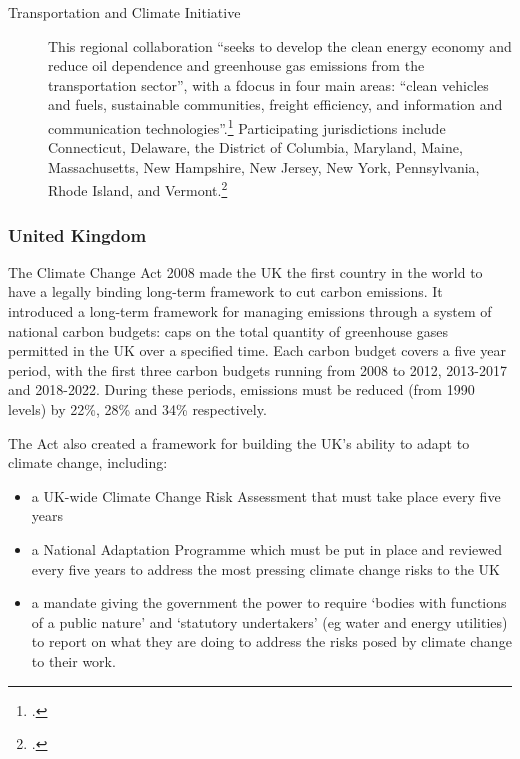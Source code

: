\begin{description}
	\item[Transportation and Climate Initiative] This regional collaboration ``seeks to develop the clean energy economy and reduce oil dependence and greenhouse gas emissions from the transportation sector'', with a fdocus in four main areas: ``clean vehicles and fuels, sustainable communities, freight efficiency, and information and communication technologies''.\footcite[][]{TranspoClimate} Participating jurisdictions include Connecticut, Delaware, the District of Columbia, Maryland, Maine, Massachusetts, New Hampshire, New Jersey, New York, Pennsylvania, Rhode Island, and Vermont.\footcite[][]{GeorgetownOnTC}
\end{description}


	\subsubsection{United Kingdom}

The Climate Change Act 2008 made the UK the first country in the world to have a legally binding long-term framework to cut carbon emissions.  It introduced a long-term framework for managing emissions through a system of national carbon budgets: caps on the total quantity of greenhouse gases permitted in the UK over a specified time. Each carbon budget covers a five year period, with the first three carbon budgets running from 2008 to 2012, 2013-2017 and 2018-2022. During these periods, emissions must be reduced (from 1990 levels) by 22\%, 28\% and 34\% respectively.

The Act also created a framework for building the UK’s ability to adapt to climate change, including:
\begin{itemize}
	\item a UK-wide Climate Change Risk Assessment that must take place every five years
	\item a National Adaptation Programme which must be put in place and reviewed every five years to address the most pressing climate change risks to the UK
	\item a mandate giving the government the power to require ‘bodies with functions of a public nature’ and ‘statutory undertakers’ (eg water and energy utilities) to report on what they are doing to address the risks posed by climate change to their work.
\end{itemize}



